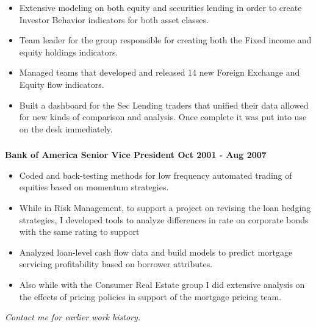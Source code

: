 \documentclass[
]{article}
\providecommand{\tightlist}{%
  \setlength{\itemsep}{0pt}\setlength{\parskip}{0pt}}
\begin{document}
\vspace{-8pt}

  \begin{itemize}
  \tightlist
  \item
	Extensive modeling on both equity 
    and securities lending in order to create Investor Behavior indicators 
    for both asset classes.

  \item Team leader for the group responsible 
    for creating both the Fixed income and equity holdings indicators.
    \item Managed teams that developed and released 14 new Foreign Exchange and Equity flow indicators.
  \item Built a
  dashboard for the Sec Lending traders that unified their data 
  allowed for new kinds of comparison and analysis.
   Once complete it was put into use on the desk immediately.    
  \end{itemize}


\hypertarget{bofa}{\subsubsection{}\label{bofa}}
\textbf {Bank of America \hfill Senior Vice President \hfill Oct 2001 -  Aug 2007}

  \begin{itemize}
  \tightlist
  \item
	Coded and back-testing methods for low frequency automated trading of equities based on momentum strategies.
  \item
   While in Risk Management, to support a project on revising the loan hedging strategies, I developed tools to analyze differences in rate on corporate bonds with the same rating to support 

  \item Analyzed loan-level cash flow data and build models to predict     mortgage servicing profitability based on borrower attributes.
  \item Also while with the Consumer Real Estate group I 
    did extensive analysis on the effects of pricing policies 
    in support of the mortgage pricing team. 
  \end{itemize}

\emph{Contact me for earlier work history.}
\end{document}
